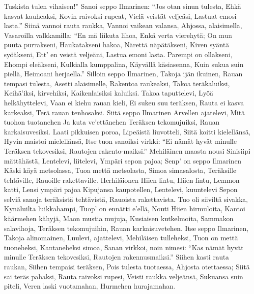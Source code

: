     Tuskista tulen vihaisen!''
  \endverse
  \beginverse
    Sanoi seppo Ilmarinen:
    ``Jos otan sinun tulesta,
    Ehkä kasvat kauheaksi,
    Kovin raivoksi rupeat,
    Vielä veistät veljeäsi,
    Lastuat emosi lasta.''
  \endverse
  \beginverse
    Siinä vannoi rauta raukka,
    Vannoi vaikean valansa,
    Ahjossa, alaisimella,
    Vasaroilla valkkamilla:
    ``En mä liikuta lihoa,
    Enkä verta vierehytä;
    On mun puuta purrakseni,
    Haukatakseni hakoa,
    Närettä näpätäkseni,
    Kiven syäntä syöäkseni,
    Ett' en veistä veljeäni,
    Lastua emoni lasta.
    Parempi on ollakseni,
    Ehompi eleäkseni,
    Kulkialla kumppalina,
    Käyvällä käsiasenna,
    Kuin sukua suin piellä,
    Heimoani herjaella.''
  \endverse
  \beginverse
    Silloin seppo Ilmarinen,
    Takoja ijän ikuinen,
    Rauan tempasi tulesta,
    Asetti alaisimelle,
    Rakentoa raukeaksi,
    Takoa teräkaluiksi,
    Keihä'iksi, kirvehiksi,
    Kaikenlaisiksi kaluiksi.
    Takoa taputtelevi,
    Lyöä helkähyttelevi,
    Vaan ei kiehu rauan kieli,
    Ei sukeu suu teräksen,
    Rauta ei kasva karkeaksi,
    Terä rauan tenhosaksi.
  \endverse
  \beginverse
    Siitä seppo Ilmarinen
    Arvellen ajatelevi,
    Mitä tuohon tuotanehen
    Ja kuta ve'ettänehen
    Teräksen tekomujuiksi,
    Rauan karkaisuvesiksi.
    Laati pikkuisen poroa,
    Lipeäistä liuvotteli,
    Siitä koitti kielellänsä,
    Hyvin maistoi mielellänsä,
    Itse tuon sanoiksi virkki:
    ``Ei nämät hyvät minulle
    Teräksen tekovesiksi,
    Rautojen rakento-maiksi.''
  \endverse
  \beginverse
    Mehiläinen maasta nousi
    Sinisiipi mättähästä,
    Lentelevi, liitelevi,
    Ympäri sepon pajoa;
    Senp' on seppo Ilmarinen
    Käski käyä metsolassa,
    Tuoa mettä metsolasta,
    Simoa simasalosta,
    Teräksille tehtäville,
    Rauoille rakettaville.
  \endverse
  \beginverse
    Herhiläionen Hiien lintu,
    Hiien lintu, Lemmon katti,
    Lensi ympäri pajoa
    Kipujansa kaupotellen,
    Lentelevi, kuuntelevi
    Sepon selviä sanoja
    teräksistä tehtävistä,
    Rauoista rakettavista.
  \endverse
  \beginverse
    Tuo oli siiviltä sivakka,
    Kynäluilta luikkahampi,
    Tuop' on ennätti e'ellä,
    Nouti Hiien hirmuloita,
    Kantoi käärmehen kähyjä,
    Maon mustia mujuja,
    Kusiaisen kutkelmoita,
    Sammakon salavihoja,
    Teräksen tekomujuihin,
    Rauan karkaisuvetehen.
  \endverse
  \beginverse
    Itse seppo Ilmarinen,
    Takoja alinomainen,
    Luulevi, ajattelevi,
    Mehiläisen tulleheksi,
    Tuon on mettä tuoneheksi,
    Kantaneheksi simoa,
    Sanan virkkoi, noin nimesi:
    ``Kas nämät hyvät minulle
    Teräksen tekovesiksi,
    Rautojen rakennusmaiksi.''
    Siihen kasti rauta raukan,
    Siihen tempaisi teräksen,
    Pois tulesta tuotaessa,
    Ahjosta otettaessa;
    Siitä sai teräs pahaksi,
    Rauta raivoksi rupesi,
    Veisti raukka veljeänsä,
    Sukuansa suin piteli,
    Veren laski vuotamahan,
    Hurmehen hurajamahan.
  \endverse
\endsong



